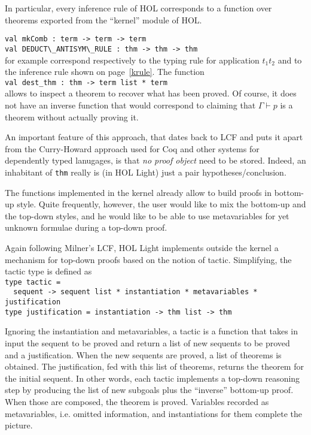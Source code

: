 \documentclass[preprint]{sigplanconf}
\begin{document}
In particular, every inference rule of HOL corresponds to a function over theorems exported from the ``kernel'' module of HOL.

\noindent
\verb+val mkComb : term -> term -> term+\\
\verb+val DEDUCT\_ANTISYM\_RULE : thm -> thm -> thm+\\
for example correspond respectively to the typing rule for application $t_1 t_2$ and to the inference rule shown on page~\ref{krule}. The function\\
\verb+val dest_thm : thm -> term list * term+\\
allows to inspect a theorem to recover what has been proved. Of course, it does not have an inverse function that would correspond to claiming that $\Gamma \vdash p$ is a theorem without actually proving it.

An important feature of this approach, that dates back to LCF and puts it apart from the Curry-Howard approach used for Coq and other systems for dependently typed lanugages, is that \emph{no proof object} need to be stored. Indeed, an inhabitant of \verb+thm+ really is (in HOL Light) just a pair hypotheses/conclusion.

The functions implemented in the kernel already allow to build proofs in bottom-up style. Quite frequently, however, the user would like to mix the bottom-up and the top-down styles, and he would like to be able to use metavariables for yet unknown formulae during a top-down proof.

Again following Milner's LCF, HOL Light implements outside the kernel a mechanism for top-down proofs based on the notion of tactic. Simplifying, the tactic type is defined as\\
\verb+type tactic =+\\
\verb+  sequent -> sequent list * instantiation * metavariables * justification+\\
\verb+type justification = instantiation -> thm list -> thm+

Ignoring the instantiation and metavariables, a tactic is a function that takes in input the sequent to be proved and return a list of new sequents to be proved and a justification. When the new sequents are proved, a list of theorems is obtained. The justification, fed with this list of theorems, returns the theorem for the initial sequent. In other words, each tactic implements a top-down reasoning step by producing the list of new subgoals plus the ``inverse'' bottom-up proof. When those are composed, the theorem is proved. Variables recorded as metavariables, i.e. omitted information, and instantiations for them complete the picture.
\end{document}
